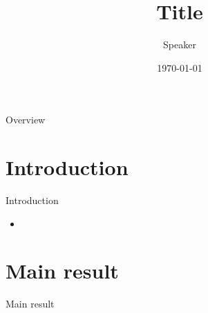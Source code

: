 \documentclass{beamer}
\title{Title}
\author{Speaker}
\institute{Institution}
\date{\today}
\begin{document}
\begin{frame}
  \titlepage
\end{frame}

\begin{frame}{Overview}
  \tableofcontents
\end{frame}

\section{Introduction}

\begin{frame}{Introduction}
  \begin{itemize}
    \item
  \end{itemize}
\end{frame}

\section{Main result}

\begin{frame}{Main result}
  \begin{theorem}
  \end{theorem}
\end{frame}
\end{document}
